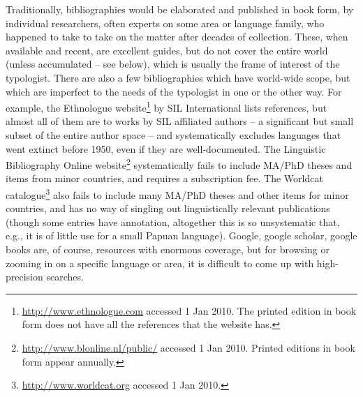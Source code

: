 \documentclass[english,11pt,twoside]{article}
\begin{document}
Traditionally, bibliographies would be elaborated and published in
book form, by individual researchers, often experts on some area or
language family, who happened to take to take on the matter after
decades of collection. These, when available and recent, are excellent
guides, but do not cover the entire world (unless accumulated -- see
below), which is usually the frame of interest of the
typologist. There are also a few bibliographies which have world-wide
scope, but which are imperfect to the needs of the typologist in one
or the other way. For example, the Ethnologue
website\footnote{\url{http://www.ethnologue.com} accessed 1 Jan
  2010. The printed edition in book form does not have all the
  references that the website has.}  by SIL International lists
references, but almost all of them are to works by SIL affiliated
authors -- a significant but small subset of the entire author space
-- and systematically excludes languages that went extinct before
1950, even if they are well-documented. The Linguistic Bibliography
Online website\footnote{\url{http://www.blonline.nl/public/} accessed
  1 Jan 2010. Printed editions in book form appear annually.}
systematically fails to include MA/PhD theses and items from minor
countries, and requires a subscription fee. The Worldcat
catalogue\footnote{\url{http://www.worldcat.org} accessed 1 Jan 2010.}
also fails to include many MA/PhD theses and other items for minor
countries, and has no way of singling out linguistically relevant
publications (though some entries have annotation, altogether this is
so unsystematic that, e.g., it is of little use for a small Papuan
language). Google, google scholar, google books are, of course,
resources with enormous coverage, but for browsing or zooming in on a
specific language or area, it is difficult to come up with
high-precision searches.
\end{document}
